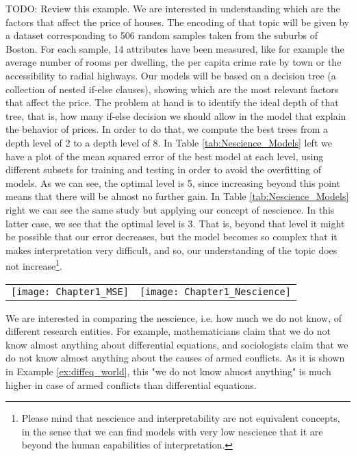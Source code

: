 \begin{example}
\label{cha1:ex:Boston}
{\color{red} TODO: Review this example.}
We are interested in understanding which are the factors that affect the price of houses. The encoding of that topic will be given by a dataset corresponding to 506 random samples taken from the suburbs of Boston. For each sample, 14 attributes have been measured, like for example the average number of rooms per dwelling, the per capita crime rate by town or the accessibility to radial highways. Our models will be based on a decision tree (a collection of nested if-else clauses), showing which are the most relevant factors that affect the price. The problem at hand is to identify the ideal depth of that tree, that is, how many if-else decision we should allow in the model that explain the behavior of prices. In order to do that, we compute the best trees from a depth level of 2 to a depth level of 8. In Table \ref{tab:Nescience_Models} left we have a plot of the mean squared error of the best model at each level, using different subsets for training and testing in order to avoid the overfitting of models. As we can see, the optimal level is 5, since increasing beyond this point means that there will be almost no further gain. In Table \ref{tab:Nescience_Models} right we can see the same study but applying our concept of nescience. In this latter case, we see that the optimal level is 3. That is, beyond that level it might be possible that our error decreases, but the model becomes so complex that it makes interpretation very difficult, and so, our understanding of the topic does not increase\footnote{Please mind that nescience and interpretability are not equivalent concepts, in the sense that we can find models with very low nescience that it are beyond the human capabilities of interpretation.}.
\end{example}

\begin{table*}
\begin{centering}
\begin{tabular}{c c}
\centering\texttt{[image: Chapter1\_MSE]}
&
\centering\texttt{[image: Chapter1\_Nescience]}
\end{tabular}
\par\end{centering}
\caption{\label{tab:Nescience_Models}RMSE and Nescience of Models}
\end{table*}

We are interested in comparing the nescience, i.e. how much we do not know, of different research entities. For example, mathematicians claim that we do not know almost anything about differential equations, and sociologists claim that we do not know almost anything about the causes of armed conflicts. As it is shown in Example \ref{ex:diffeq_world}, this "we do not know almost anything" is much higher in case of armed conflicts than differential equations.

